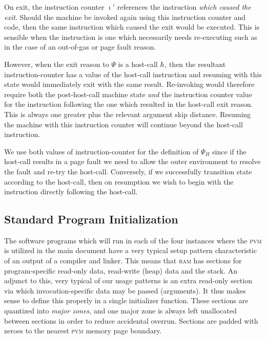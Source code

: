 On exit, the instruction counter $\imath'$ references the instruction \emph{which caused the exit}. Should the machine be invoked again using this instruction counter and code, then the same instruction which caused the exit would be executed. This is sensible when the instruction is one which necessarily needs re-executing such as in the case of an out-of-gas or page fault reason.

However, when the exit reason to $\Psi$ is a host-call $\hbar$, then the resultant instruction-counter has a value of the host-call instruction and resuming with this state would immediately exit with the same result. Re-invoking would therefore require both the post-host-call machine state \emph{and} the instruction counter value for the instruction following the one which resulted in the host-call exit reason. This is always one greater plus the relevant argument skip distance. Resuming the machine with this instruction counter will continue beyond the host-call instruction.

We use both values of instruction-counter for the definition of $\Psi_H$ since if the host-call results in a page fault we need to allow the outer environment to resolve the fault and re-try the host-call. Conversely, if we successfully transition state according to the host-call, then on resumption we wish to begin with the instruction directly following the host-call.

\subsection{Standard Program Initialization}\label{sec:standardprograminit}
The software programs which will run in each of the four instances where the \textsc{pvm} is utilized in the main document have a very typical setup pattern characteristic of an output of a compiler and linker. This means that \textsc{ram} has sections for program-specific read-only data, read-write (heap) data and the stack. An adjunct to this, very typical of our usage patterns is an extra read-only section via which invocation-specific data may be passed (\ie arguments). It thus makes sense to define this properly in a single initializer function. These sections are quantized into \emph{major zones}, and one major zone is always left unallocated between sections in order to reduce accidental overrun. Sections are padded with zeroes to the nearest \textsc{pvm} memory page boundary.

